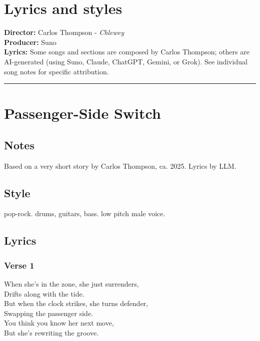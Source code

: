 \section{Lyrics and styles}\label{lyrics-and-styles}

\textbf{Director:} Carlos Thompson - \emph{Chlewey}\\
\textbf{Producer:} Suno\\
\textbf{Lyrics:} Some songs and sections are composed by Carlos
Thompson; others are AI-generated (using Suno, Claude, ChatGPT, Gemini,
or Grok). See individual song notes for specific attribution.

\begin{center}\rule{0.5\linewidth}{0.5pt}\end{center}

\section{Passenger-Side Switch}\label{passenger-side-switch}

\subsection{Notes}\label{notes}

Based on a very short story by Carlos Thompson, ca. 2025. Lyrics by LLM.

\subsection{Style}\label{style}

pop-rock. drums, guitars, bass. low pitch male voice.

\subsection{Lyrics}\label{lyrics}

\subsubsection{Verse 1}\label{verse-1}

\hspace{0pt}When she's in the zone, she just surrenders,\\
Drifts along with the tide.\\
But when the clock strikes, she turns defender,\\
Swapping the passenger side.\\
You think you know her next move,\\
But she's rewriting the groove.

